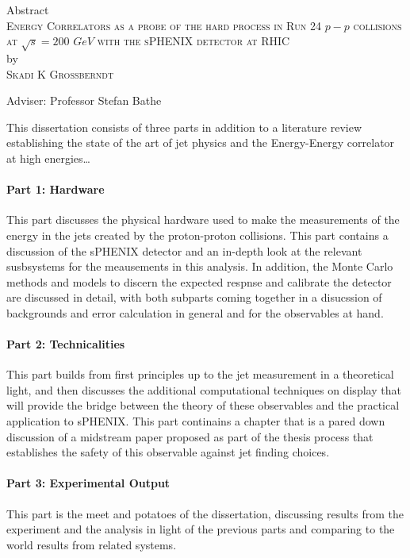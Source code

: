 \begin{center}
Abstract \\
\textsc{Energy Correlators as a probe of the hard process in Run 24 $p-p$ collisions at $\sqrt{s}=200$ $GeV$ with the sPHENIX detector at RHIC} \\
by \\
\textsc{Skadi K Grossberndt} \\[0.25in]
\end{center}

\vspace{0.25in}

\noindent Adviser: Professor Stefan Bathe

\vspace{0.25in}

\noindent This dissertation consists of three parts in addition to a literature review establishing the state of the art of jet physics and the Energy-Energy correlator at high energies\ldots

\paragraph{Part 1: Hardware} %
This part discusses the physical hardware used to make the measurements of the energy in the jets created by the proton-proton collisions. 
This part contains a discussion of the sPHENIX detector and an in-depth look at the relevant susbsystems for the meausements in this analysis. 
In addition, the Monte Carlo methods and models to discern the expected respnse and calibrate the detector are discussed in detail, with both subparts coming together in a disucssion of backgrounds and error calculation in general and for the observables at hand.
\paragraph{Part 2: Technicalities} %
This part builds from first principles up to the jet measurement in a theoretical light, and then discusses the additional computational techniques on display that will provide the bridge between the theory of these observables and the practical application to sPHENIX. 
This part continains a chapter that is a pared down discussion of a midstream paper proposed as part of the thesis process that establishes the safety of this observable against jet finding choices.
\paragraph{Part 3: Experimental Output} %
This part is the meet and potatoes of the dissertation, discussing results from the experiment and the analysis in light of the previous parts and comparing to the world results from related systems.

